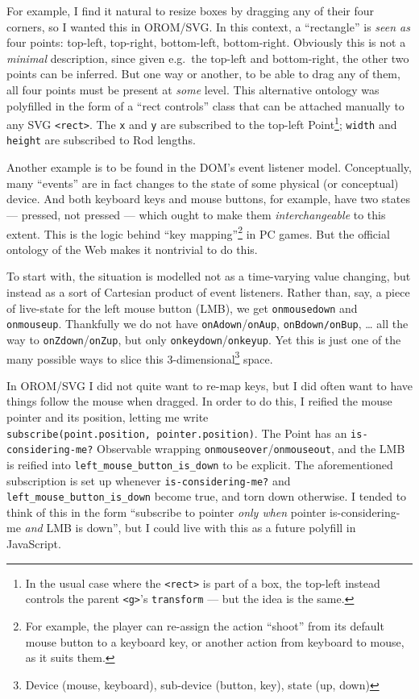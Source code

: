 For example, I find it natural to resize boxes by dragging any of their
four corners, so I wanted this in OROM/SVG. In this context, a
``rectangle'' is \emph{seen as} four points: top-left, top-right,
bottom-left, bottom-right. Obviously this is not a \emph{minimal}
description, since given e.g.~the top-left and bottom-right, the other
two points can be inferred. But one way or another, to be able to drag
any of them, all four points must be present at \emph{some} level. This
alternative ontology was polyfilled in the form of a ``rect controls''
class that can be attached manually to any SVG
\texttt{\textless{}rect\textgreater{}}. The \texttt{x} and \texttt{y}
are subscribed to the top-left Point\footnote{In the usual case where
  the \texttt{\textless{}rect\textgreater{}} is part of a box, the
  top-left instead controls the parent
  \texttt{\textless{}g\textgreater{}}'s \texttt{transform} --- but the
  idea is the same.}; \texttt{width} and \texttt{height} are subscribed
to Rod lengths.

Another example is to be found in the DOM's event listener model.
Conceptually, many ``events'' are in fact changes to the state of some
physical (or conceptual) device. And both keyboard keys and mouse
buttons, for example, have two states --- pressed, not pressed --- which
ought to make them \emph{interchangeable} to this extent. This is the
logic behind ``key mapping''\footnote{For example, the player can
  re-assign the action ``shoot'' from its default mouse button to a
  keyboard key, or another action from keyboard to mouse, as it suits
  them.} in PC games. But the official ontology of the Web makes it
nontrivial to do this.

To start with, the situation is modelled not as a time-varying value
changing, but instead as a sort of Cartesian product of event listeners.
Rather than, say, a piece of live-state for the left mouse button (LMB),
we get \texttt{onmousedown} and \texttt{onmouseup}. Thankfully we do not
have \texttt{onAdown}/\texttt{onAup}, \texttt{onBdown/onBup}, \ldots{}
all the way to \texttt{onZdown}/\texttt{onZup}, but only
\texttt{onkeydown}/\texttt{onkeyup}. Yet this is just one of the many
possible ways to slice this 3-dimensional\footnote{Device (mouse,
  keyboard), sub-device (button, key), state (up, down)} space.

In OROM/SVG I did not quite want to re-map keys, but I did often want to
have things follow the mouse when dragged. In order to do this, I
reified the mouse pointer and its position, letting me write
\texttt{subscribe(point.position,\ pointer.position)}. The Point has an
\texttt{is-considering-me?} Observable wrapping
\texttt{onmouseover}/\texttt{onmouseout}, and the LMB is reified into
\texttt{left\_mouse\_button\_is\_down} to be explicit. The
aforementioned subscription is set up whenever
\texttt{is-considering-me?} and \texttt{left\_mouse\_button\_is\_down}
become true, and torn down otherwise. I tended to think of this in the
form ``subscribe to pointer \emph{only when} pointer is-considering-me
\emph{and} LMB is down'', but I could live with this as a future
polyfill in JavaScript.

